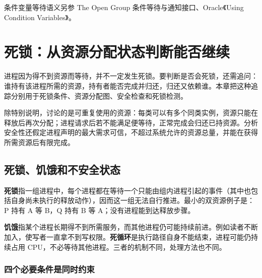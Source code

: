 条件变量等待语义另参 The Open Group 条件等待与通知接口、Oracle《Using Condition Variables》。

\section{死锁：从资源分配状态判断能否继续}\label{OS02-module-04}

进程因为得不到资源而等待，并不一定发生死锁。要判断是否会死锁，还需追问：谁持有该进程所需的资源，持有者能否完成并归还，归还又依赖谁。本章把这种追踪分别用于死锁条件、资源分配图、安全检查和死锁检测。

除特别说明，讨论的是可重复使用的资源：每类可以有多个同类实例，资源只能在释放后再次分配；进程请求后若不能满足便等待，正常完成会归还已持资源。分析安全性还假定进程声明的最大需求可信，不超过系统允许的资源总量，并能在获得所需资源后有限完成。

\subsection{死锁、饥饿和不安全状态}\label{OS02-4-1}

\textbf{死锁}指一组进程中，每个进程都在等待一个只能由组内进程引起的事件（其中也包括自身尚未执行的释放动作），因而这一组无法自行推进。最小的双资源例子是：P 持有 A 等 B，Q 持有 B 等 A；没有进程能到达释放步骤。

\textbf{饥饿}指某个进程长期得不到所需服务，而其他进程仍可能持续前进。例如读者不断加入，使写者一直拿不到写权限。\textbf{死循环}是执行路径自身不能结束，进程可能仍持续占用 CPU，不必等待其他进程。三者的机制不同，处理方法也不同。

\subsubsection{四个必要条件是同时约束}\label{OS02-auto-23}

